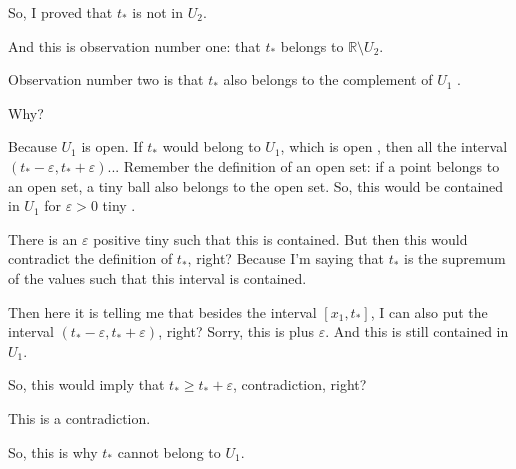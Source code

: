 \begin{proofWrapper}
\begin{speech}[00:15:10 - 00:16:54]
So, I proved that $t_*$ is not in $U_2$.

And this is observation number one: that $t_*$ belongs to $\mathbb{R} \setminus U_2$.
\end{speech}

\begin{hidden}
\end{hidden}

\begin{speech}[00:16:54 - 00:18:05]
Observation number two is that $t_*$ also belongs to the complement of $U_1$ .

Why? 

Because $U_1$ is open. If $t_*$ would belong to $U_1$, which is open , then all the interval $(t_* - \varepsilon, t_* + \varepsilon)$... Remember the definition of an open set: if a point belongs to an open set, a tiny ball also belongs to the open set. So, this would be contained in $U_1$ for $\varepsilon > 0$ tiny .
\end{speech}

\begin{speech}[00:18:05 - 00:19:25]
There is an $\varepsilon$ positive tiny such that this is contained. But then this would contradict the definition of $t_*$, right? Because I'm saying that $t_*$ is the supremum of the values such that this interval is contained.

Then here it is telling me that besides the interval $[x_1, t_*]$, I can also put the interval $(t_* - \varepsilon, t_* + \varepsilon)$, right?  Sorry, this is plus $\varepsilon$. And this is still contained in $U_1$.

So, this would imply that $t_* \ge t_* + \varepsilon$, contradiction, right? 

This is a contradiction.

So, this is why $t_*$ cannot belong to $U_1$.
\end{speech}


\end{proofWrapper}

